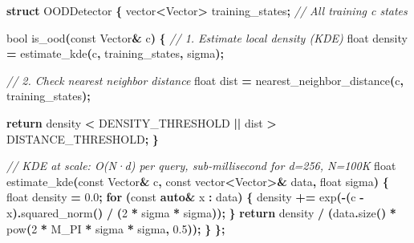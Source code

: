 \documentclass[
  11pt,
  a4paper,
]{article}
\newenvironment{Shaded}{\begin{snugshade}}{\end{snugshade}}
\newcommand{\AttributeTok}[1]{\textcolor[rgb]{0.13,0.29,0.53}{#1}}
\newcommand{\CommentTok}[1]{\textcolor[rgb]{0.56,0.35,0.01}{\textit{#1}}}
\newcommand{\ControlFlowTok}[1]{\textcolor[rgb]{0.13,0.29,0.53}{\textbf{#1}}}
\newcommand{\DataTypeTok}[1]{\textcolor[rgb]{0.13,0.29,0.53}{#1}}
\newcommand{\DecValTok}[1]{\textcolor[rgb]{0.00,0.00,0.81}{#1}}
\newcommand{\FloatTok}[1]{\textcolor[rgb]{0.00,0.00,0.81}{#1}}
\newcommand{\KeywordTok}[1]{\textcolor[rgb]{0.13,0.29,0.53}{\textbf{#1}}}
\newcommand{\NormalTok}[1]{#1}
\newcommand{\OperatorTok}[1]{\textcolor[rgb]{0.81,0.36,0.00}{\textbf{#1}}}
\begin{document}
\begin{Shaded}
\begin{Highlighting}[]
\KeywordTok{struct}\NormalTok{ OODDetector }\OperatorTok{\{}
\NormalTok{    vector}\OperatorTok{\textless{}}\NormalTok{Vector}\OperatorTok{\textgreater{}}\NormalTok{ training\_states}\OperatorTok{;}  \CommentTok{// All training c states}
    
    \DataTypeTok{bool}\NormalTok{ is\_ood}\OperatorTok{(}\AttributeTok{const}\NormalTok{ Vector}\OperatorTok{\&}\NormalTok{ c}\OperatorTok{)} \OperatorTok{\{}
        \CommentTok{// 1. Estimate local density (KDE)}
        \DataTypeTok{float}\NormalTok{ density }\OperatorTok{=}\NormalTok{ estimate\_kde}\OperatorTok{(}\NormalTok{c}\OperatorTok{,}\NormalTok{ training\_states}\OperatorTok{,}\NormalTok{ sigma}\OperatorTok{);}
        
        \CommentTok{// 2. Check nearest neighbor distance}
        \DataTypeTok{float}\NormalTok{ dist }\OperatorTok{=}\NormalTok{ nearest\_neighbor\_distance}\OperatorTok{(}\NormalTok{c}\OperatorTok{,}\NormalTok{ training\_states}\OperatorTok{);}
        
        \ControlFlowTok{return}\NormalTok{ density }\OperatorTok{\textless{}}\NormalTok{ DENSITY\_THRESHOLD }\OperatorTok{||}\NormalTok{ dist }\OperatorTok{\textgreater{}}\NormalTok{ DISTANCE\_THRESHOLD}\OperatorTok{;}
    \OperatorTok{\}}
    
    \CommentTok{// KDE at scale: O(N·d) per query, sub{-}millisecond for d=256, N=100K}
    \DataTypeTok{float}\NormalTok{ estimate\_kde}\OperatorTok{(}\AttributeTok{const}\NormalTok{ Vector}\OperatorTok{\&}\NormalTok{ c}\OperatorTok{,} \AttributeTok{const}\NormalTok{ vector}\OperatorTok{\textless{}}\NormalTok{Vector}\OperatorTok{\textgreater{}\&}\NormalTok{ data}\OperatorTok{,} \DataTypeTok{float}\NormalTok{ sigma}\OperatorTok{)} \OperatorTok{\{}
        \DataTypeTok{float}\NormalTok{ density }\OperatorTok{=} \FloatTok{0.0}\OperatorTok{;}
        \ControlFlowTok{for} \OperatorTok{(}\AttributeTok{const} \KeywordTok{auto}\OperatorTok{\&}\NormalTok{ x }\OperatorTok{:}\NormalTok{ data}\OperatorTok{)} \OperatorTok{\{}
\NormalTok{            density }\OperatorTok{+=}\NormalTok{ exp}\OperatorTok{({-}(}\NormalTok{c }\OperatorTok{{-}}\NormalTok{ x}\OperatorTok{).}\NormalTok{squared\_norm}\OperatorTok{()} \OperatorTok{/} \OperatorTok{(}\DecValTok{2} \OperatorTok{*}\NormalTok{ sigma }\OperatorTok{*}\NormalTok{ sigma}\OperatorTok{));}
        \OperatorTok{\}}
        \ControlFlowTok{return}\NormalTok{ density }\OperatorTok{/} \OperatorTok{(}\NormalTok{data}\OperatorTok{.}\NormalTok{size}\OperatorTok{()} \OperatorTok{*}\NormalTok{ pow}\OperatorTok{(}\DecValTok{2} \OperatorTok{*}\NormalTok{ M\_PI }\OperatorTok{*}\NormalTok{ sigma }\OperatorTok{*}\NormalTok{ sigma}\OperatorTok{,} \FloatTok{0.5}\OperatorTok{));}
    \OperatorTok{\}}
\OperatorTok{\};}
\end{Highlighting}
\end{Shaded}
\end{document}

